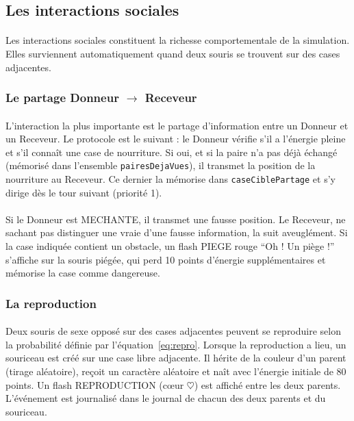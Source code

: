\bigskip

\subsection{Les interactions sociales}

\paragraph{} Les interactions sociales constituent la richesse comportementale de la simulation. Elles surviennent automatiquement quand deux souris se trouvent sur des cases adjacentes.

\subsubsection{Le partage Donneur $\rightarrow$ Receveur}

\paragraph{} L'interaction la plus importante est le partage d'information entre un Donneur et un Receveur. Le protocole est le suivant : le Donneur vérifie s'il a l'énergie pleine et s'il connaît une case de nourriture. Si oui, et si la paire n'a pas déjà échangé (mémorisé dans l'ensemble \texttt{pairesDejaVues}), il transmet la position de la nourriture au Receveur. Ce dernier la mémorise dans \texttt{caseCiblePartage} et s'y dirige dès le tour suivant (priorité 1).

\paragraph{} Si le Donneur est MECHANTE, il transmet une fausse position. Le Receveur, ne sachant pas distinguer une vraie d'une fausse information, la suit aveuglément. Si la case indiquée contient un obstacle, un flash PIEGE rouge ``Oh ! Un piège !'' s'affiche sur la souris piégée, qui perd 10 points d'énergie supplémentaires et mémorise la case comme dangereuse.

\subsubsection{La reproduction}

\paragraph{} Deux souris de sexe opposé sur des cases adjacentes peuvent se reproduire selon la probabilité définie par l'équation~\ref{eq:repro}. Lorsque la reproduction a lieu, un souriceau est créé sur une case libre adjacente. Il hérite de la couleur d'un parent (tirage aléatoire), reçoit un caractère aléatoire et naît avec l'énergie initiale de 80 points. Un flash REPRODUCTION (cœur $\heartsuit$) est affiché entre les deux parents. L'événement est journalisé dans le journal de chacun des deux parents et du souriceau.

